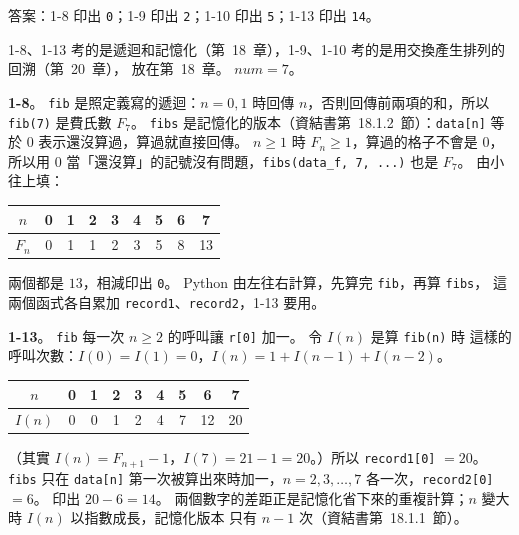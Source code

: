 \begin{pastsoln}
答案：1-8 印出 \texttt{0}；1-9 印出 \texttt{2}；1-10 印出 \texttt{5}；1-13 印出 \texttt{14}。

1-8、1-13 考的是遞迴和記憶化（第~18~章），1-9、1-10 考的是用交換產生排列的回溯（第~20~章），
放在第~18~章。 $\mathit{num} = 7$。

\textbf{1-8}。 \texttt{fib} 是照定義寫的遞迴：$n = 0, 1$ 時回傳 $n$，否則回傳前兩項的和，所以
\texttt{fib(7)} 是費氏數 $F_7$。 \texttt{fibs} 是記憶化的版本（資結書第~18.1.2~節）：\texttt{data[n]}
等於 $0$ 表示還沒算過，算過就直接回傳。 $n \ge 1$ 時 $F_n \ge 1$，算過的格子不會是 $0$，所以用 $0$
當「還沒算」的記號沒有問題，\texttt{fibs(data\_f, 7, ...)} 也是 $F_7$。 由小往上填：
\begin{center}
\small
\begin{tabular}{c|cccccccc}
$n$ & 0 & 1 & 2 & 3 & 4 & 5 & 6 & 7 \\ \hline
$F_n$ & 0 & 1 & 1 & 2 & 3 & 5 & 8 & 13 \\
\end{tabular}
\end{center}
兩個都是 $13$，相減印出 \texttt{0}。 Python 由左往右計算，先算完 \texttt{fib}，再算 \texttt{fibs}，
這兩個函式各自累加 \texttt{record1}、\texttt{record2}，1-13 要用。

\textbf{1-13}。 \texttt{fib} 每一次 $n \ge 2$ 的呼叫讓 \texttt{r[0]} 加一。 令 $I(n)$ 是算 \texttt{fib(n)} 時
這樣的呼叫次數：$I(0) = I(1) = 0$，$I(n) = 1 + I(n-1) + I(n-2)$。
\begin{center}
\small
\begin{tabular}{c|cccccccc}
$n$ & 0 & 1 & 2 & 3 & 4 & 5 & 6 & 7 \\ \hline
$I(n)$ & 0 & 0 & 1 & 2 & 4 & 7 & 12 & 20 \\
\end{tabular}
\end{center}
（其實 $I(n) = F_{n+1} - 1$，$I(7) = 21 - 1 = 20$。）所以 \texttt{record1[0]} $= 20$。 \texttt{fibs} 只在
\texttt{data[n]} 第一次被算出來時加一，$n = 2, 3, \ldots, 7$ 各一次，\texttt{record2[0]} $= 6$。 印出
$20 - 6 = 14$。 兩個數字的差距正是記憶化省下來的重複計算；$n$ 變大時 $I(n)$ 以指數成長，記憶化版本
只有 $n - 1$ 次（資結書第~18.1.1~節）。


\end{pastsoln}

